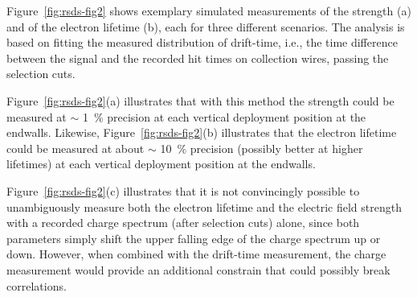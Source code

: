 Figure~\ref{fig:rsds-fig2}
shows exemplary simulated %
 measurements of the \efield strength (a) and of the electron lifetime (b), each for three different scenarios. The analysis is based on fitting the measured distribution of drift-time, i.e., the time difference between the  signal
and the recorded hit times on collection wires, passing the selection cuts.

Figure~\ref{fig:rsds-fig2}(a)
illustrates that with this method the \efield strength could be measured at $\sim$ \SI{1}{\%} precision at each vertical deployment position at the endwalls. Likewise, Figure~\ref{fig:rsds-fig2}(b)
illustrates that the electron lifetime could be measured at about $\sim$ \SI{10}{\%} precision (possibly better at higher lifetimes) at each vertical deployment position at the endwalls. 

Figure~\ref{fig:rsds-fig2}(c)
illustrates that it is not convincingly possible to unambiguously measure both the electron lifetime and the electric field strength with a recorded charge spectrum (after selection cuts) alone, since both parameters simply shift the upper falling edge of the charge spectrum up or down. However, when combined with the drift-time measurement, the charge measurement would provide an additional constrain that could possibly break correlations. 



